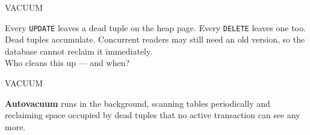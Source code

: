 \documentclass[aspectratio=169,10pt]{beamer}
\begin{document}
\begin{frame}{VACUUM}

  \begin{block}{}
    Every \texttt{UPDATE} leaves a dead tuple on the heap page.
    Every \texttt{DELETE} leaves one too.\\[0.4em]
    Dead tuples accumulate.  Concurrent readers may still need an old
    version, so the database cannot reclaim it immediately.\\[0.4em]
    Who cleans this up --- and when?
  \end{block}

\end{frame}

\begin{frame}{VACUUM}

  \begin{block}{}
    \textbf{Autovacuum} runs in the background, scanning tables
    periodically and reclaiming space occupied by dead tuples that
    no active transaction can see any more.
  \end{block}

\end{frame}
\end{document}

